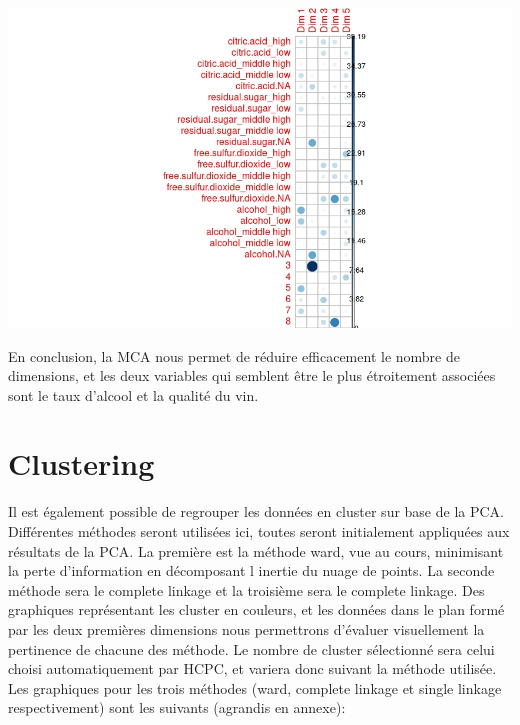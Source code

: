 \documentclass[11pt,a4paper]{article}
\begin{document}
\begin{center}
\includegraphics[scale=0.4]{"contrib"}
\end{center}

En conclusion, la MCA nous permet de réduire efficacement le nombre de dimensions, et les deux variables qui semblent être le plus étroitement associées sont le taux d'alcool et la qualité du vin.

\section{Clustering}

Il est également possible de regrouper les données en cluster sur base de la PCA. Différentes méthodes seront utilisées ici, toutes seront initialement appliquées aux résultats de la PCA. La première est la méthode ward, vue au cours, minimisant la perte d'information en décomposant l inertie du nuage de points. La seconde méthode sera le complete linkage et la troisième sera le complete linkage. Des graphiques représentant les cluster en couleurs, et les données dans le plan formé par les deux premières dimensions nous permettrons d'évaluer visuellement la pertinence de chacune des méthode. Le nombre de cluster  sélectionné sera celui choisi automatiquement par HCPC, et variera donc suivant la méthode utilisée. Les graphiques pour les trois méthodes (ward, complete linkage et single linkage respectivement) sont les suivants (agrandis en annexe):
\end{document}
